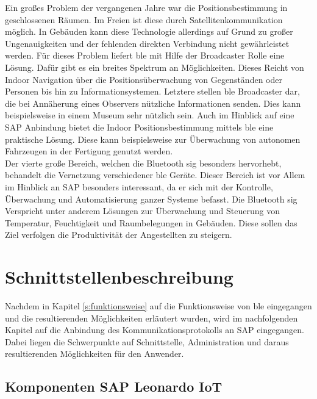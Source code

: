 \noindent Ein großes Problem der vergangenen Jahre war die Positionsbestimmung in geschlossenen Räumen. Im Freien ist diese durch Satellitenkommunikation möglich. In Gebäuden kann diese Technologie allerdings auf Grund zu großer Ungenauigkeiten und der fehlenden direkten Verbindung nicht gewährleistet werden. Für dieses Problem liefert \ac{ble} mit Hilfe der Broadcaster Rolle eine Lösung. Dafür gibt es ein breites Spektrum an Möglichkeiten. Dieses Reicht von Indoor Navigation über die Positionsüberwachung von Gegenständen oder Personen bis hin zu Informationsystemen. Letztere stellen \ac{ble} Broadcaster dar, die bei Annäherung eines Observers nützliche Informationen senden. Dies kann beispielsweise in einem Museum sehr nützlich sein. Auch im Hinblick auf eine SAP Anbindung bietet die Indoor Positionsbestimmung mittels \ac{ble} eine praktische Lösung. Diese kann beispielsweise zur Überwachung von autonomen Fahrzeugen in der Fertigung genutzt werden.\\          

\noindent Der vierte große Bereich, welchen die Bluetooth \ac{sig} besonders hervorhebt, behandelt die Vernetzung verschiedener \ac{ble} Geräte. Dieser Bereich ist vor Allem im Hinblick an SAP besonders interessant, da er sich mit der Kontrolle, Überwachung und Automatisierung ganzer Systeme befasst. Die Bluetooth \ac{sig} Verspricht unter anderem Lösungen zur Überwachung und Steuerung von Temperatur, Feuchtigkeit und Raumbelegungen in Gebäuden. Diese sollen das Ziel verfolgen die Produktivität der Angestellten zu steigern.\\   

\section{Schnittstellenbeschreibung}
\label{s:interface} 

\noindent Nachdem in Kapitel \ref{s:funktionsweise} auf die Funktionsweise von \ac{ble} eingegangen und die resultierenden Möglichkeiten erläutert wurden, wird im nachfolgenden Kapitel auf die Anbindung des Kommunikationsprotokolls an SAP eingegangen. Dabei liegen die Schwerpunkte auf Schnittstelle, Administration und daraus resultierenden Möglichkeiten für den Anwender.\\

\subsection{Komponenten SAP Leonardo IoT}
\label{ss:interface:sap}

